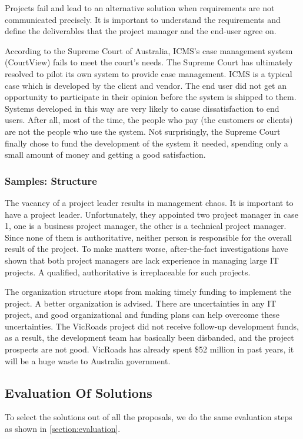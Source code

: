 Projects fail and lead to an alternative solution when requirements are not communicated precisely. It is important to understand the requirements and define the deliverables that the project manager and the end-user agree on.

According to the Supreme Court of Australia, ICMS’s case management system (CourtView) fails to meet the court’s needs. The Supreme Court has ultimately resolved to pilot its own system to provide case management. ICMS is a typical case which is developed by the client and vendor. The end user did not get an opportunity to participate in their opinion before the system is shipped to them. Systems developed in this way are very likely to cause dissatisfaction to end users. After all, most of the time, the people who pay (the customers or clients) are not the people who use the system. Not surprisingly, the Supreme Court finally chose to fund the development of the system it needed, spending only a small amount of money and getting a good satisfaction.

\subsubsection{Samples: Structure}
The vacancy of a project leader results in management chaos. It is important to have a project leader. Unfortunately, they appointed two project manager in case 1, one is a business project manager, the other is a technical project manager. Since none of them is authoritative, neither person is responsible for the overall result of the project. To make matters worse, after-the-fact investigations have shown that both project managers are lack experience in managing large IT projects. A qualified, authoritative is irreplaceable for such projects.

The organization structure stops from making timely funding to implement the project. A better organization is advised. There are uncertainties in any IT project, and good organizational and funding plans can help overcome these uncertainties. The VicRoads project did not receive follow-up development funds, as a result, the development team has basically been disbanded, and the project prospects are not good. VicRoads has already spent \$52 million in past years, it will be a huge waste to Australia government. 


\subsection{Evaluation Of Solutions}
To select the solutions out of all the proposals, we do the same evaluation steps as shown in \ref{section:evaluation}.

